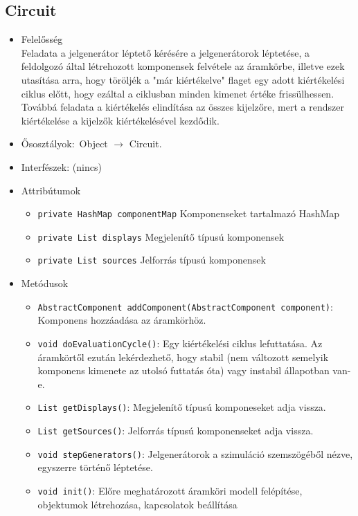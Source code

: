 \subsection{Circuit}
\begin{itemize}
\item Felelősség\\
Feladata a jelgenerátor léptető kérésére a jelgenerátorok léptetése, a feldolgozó  által létrehozott komponensek felvétele az áramkörbe, illetve ezek utasítása arra,  hogy töröljék a "már kiértékelve" flaget egy adott kiértékelési ciklus előtt, hogy ezáltal a  ciklusban minden kimenet értéke frissülhessen.  Továbbá feladata a kiértékelés elindítása az összes kijelzőre, mert a rendszer kiértékelése  a kijelzők kiértékelésével kezdődik.
\item Ősosztályok:\ Object $\rightarrow{}$ Circuit.
\item Interfészek: (nincs)
\item Attribútumok $\ $
\begin{itemize}
	\item \texttt{private HashMap componentMap} Komponenseket tartalmazó HashMap
	\item \texttt{private List displays} Megjelenítő típusú komponensek
	\item \texttt{private List sources} Jelforrás típusú komponensek
\end{itemize}
\item Metódusok$\ $
\begin{itemize}
	\item \texttt{AbstractComponent addComponent(AbstractComponent component)}: Komponens hozzáadása az áramkörhöz.
	\item \texttt{void doEvaluationCycle()}: Egy kiértékelési ciklus lefuttatása. Az áramkörtől ezután lekérdezhető, hogy  stabil (nem változott semelyik komponens kimenete az utolsó futtatás óta)  vagy instabil állapotban van-e.
	\item \texttt{List getDisplays()}: Megjelenítő típusú komponeseket adja vissza.
	\item \texttt{List getSources()}: Jelforrás típusú komponenseket adja vissza.
	\item \texttt{void stepGenerators()}: Jelgenerátorok a szimuláció szemszögéből nézve, egyszerre történő  léptetése.
	\item \texttt{void init()}: Előre meghatározott áramköri modell felépítése, objektumok létrehozása, kapcsolatok beállítása
\end{itemize}
\end{itemize}

